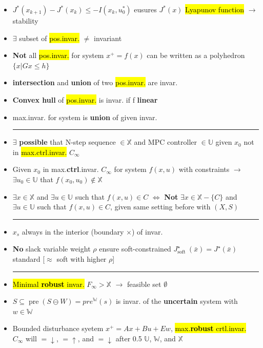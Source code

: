 \documentclass[10pt,a4paper,landscape]{article}
\newcommand{\quadRule}{\vspace{-3pt}\rule{0.23\textwidth}{0.4pt}}
\begin{document}
\begin{multicols*}{4}
\begin{itemize}
    \quadRule
    
    \item $J^{*}\left(x_{k+1}\right)-J^{*}\left(x_{k}\right) \leq-I\left(x_{k}, u_{0}^{*}\right)$ eusures $J^*(x)$ \hl{Lyapunov function} $\rightarrow$ stability
	\item $\exists$ subset of \hl{pos.invar.} $\neq$ invariant
	\item \textbf{Not} all \hl{pos.invar.} for system $x^+ = f(x)$ can be written as a polyhedron $\{x | G x \leq h\}$
	\item \textbf{intersection} and \textbf{union} of two \hl{pos.invar.} are invar.
	\item \textbf{Convex hull} of \hl{pos.invar.} is invar. if f \textbf{linear}
	\item max.invar. for system is \textbf{union} of given invar.
	
    \quadRule
    
	\item $\exists$ \textbf{possible} that N-step sequence $\in \mathbb{X}$ and MPC controller $\in \mathbb{U}$ given $x_0$ not in \hl{max.ctrl.invar.} $C_{\infty}$
    \item Given $x_0$ in max.\textbf{ctrl}.invar. $C_{\infty}$ for system $f(x,u)$ with constraints $\rightarrow$ $\exists u_0 \in \mathbb{U}$ that $f(x_0, u_0) \notin \mathbb{X}$
    \item $\exists x \in \mathbb{X} $ and $\exists u \in \mathbb{U} $ such that $f(x,u) \in C $ $\iff$
    \textbf{Not} $\exists x \in \mathbb{X}-\{C\} $ and $\exists u \in \mathbb{U} $ such that $f(x,u) \in C $, given same setting before with $(X,S)$
    
    \quadRule
    
    \item $x_s$ always in the interior (boundary $\times$) of invar.
    \item \textbf{No} slack variable weight $\rho$ ensure soft-constrained $J_{\text {soft }}^{\star}(\bar{x})=J^{\star}(\bar{x})$ standard [$\approx$ soft with higher $\rho$]
    
    \quadRule
    
    \item \hl{Minimal \textbf{robust} invar.} $F_{\infty} > \mathbb{X}$ $\rightarrow$ feasible set $\emptyset$
    \item $S \subseteq \operatorname{pre}(S \ominus W)=pre^{\mathbb{W}}(s)$ is invar. of the \textbf{uncertain} system with $w \in \mathbb{W}$
    \item Bounded disturbance syetem $x^{+}=A x+B u+E w$, \hl{max.\textbf{robust} crtl.invar.} $C_{\infty}$ will $= \downarrow$, $= \uparrow$, and $= \downarrow$ after 0.5 $\mathbb{U}$, $\mathbb{W}$, and $\mathbb{X}$
    

\end{itemize}
\end{multicols*}
\end{document}
